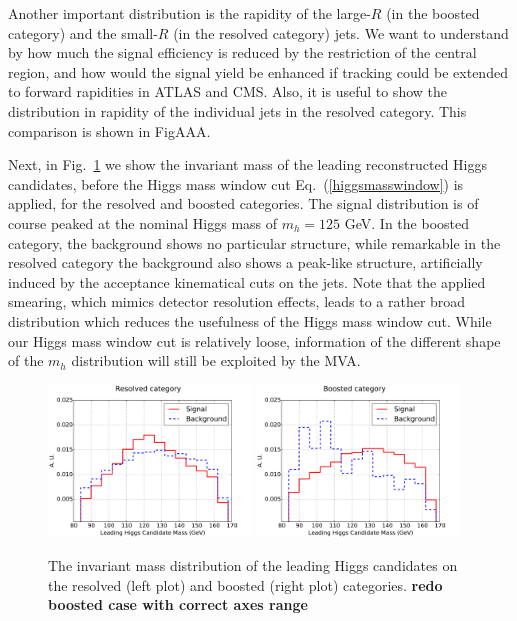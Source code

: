 Another important distribution is the rapidity of the large-$R$
(in the boosted category) and the small-$R$ (in the resolved
category) jets.
%
We want to understand by how much the signal efficiency is reduced
by the restriction of the central region, and how would
the signal yield be enhanced if tracking could be extended
to forward rapidities in ATLAS and CMS.
%
Also, it is useful to show the distribution in rapidity of the
individual jets in the resolved category.
%
This comparison is shown in FigAAA.




Next, in Fig.~\ref{fig:mHHinv} we show the invariant mass
of the leading reconstructed Higgs candidates, before the Higgs mass window
cut Eq.~(\ref{higgsmasswindow})
  is applied, for the resolved and boosted categories.
%
The signal distribution is of course peaked at the
nominal Higgs mass of $m_h=125$ GeV.
%
In the boosted category, the background shows no particular
structure, while remarkable in the resolved category the background
also shows a peak-like structure, artificially induced by the
acceptance kinematical cuts on the jets.
%
Note that the applied smearing, which mimics detector resolution effects,
leads to a rather broad distribution which reduces the usefulness
of the Higgs mass window cut.
%
While our Higgs mass window cut is relatively loose,
information of the different shape of the $m_{h}$
distribution will still be exploited by the MVA.
%

\begin{figure}[t]
\begin{center}
  \includegraphics[width=0.48\textwidth]{plots/m_H0_res_C1.pdf}
  \includegraphics[width=0.48\textwidth]{plots/m_H0_boost_C1.pdf}
  \caption{\small The invariant mass distribution of the leading
    Higgs candidates on the resolved (left plot) and boosted (right
    plot) categories. {\bf redo boosted case with correct axes range}
}
\label{fig:mHHinv}
\end{center}
\end{figure}


